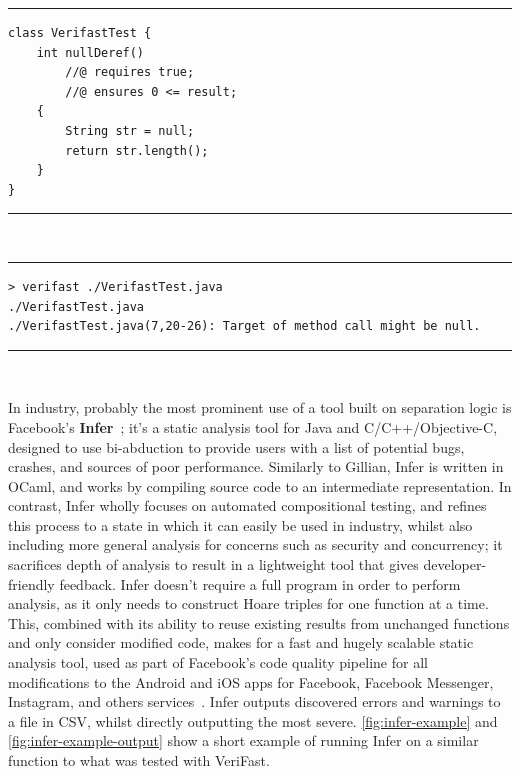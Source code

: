 \noindent\rule{\textwidth}{0.5pt}
\vspace{-0.6cm}
\begin{verbatim}
class VerifastTest {
    int nullDeref()
        //@ requires true;
        //@ ensures 0 <= result;
    {
        String str = null;
        return str.length();
    }
}
\end{verbatim}
\vspace{-0.4cm}
\noindent\rule{\textwidth}{0.5pt}
\vspace{-0.6cm}
~
\label{fig:verifast-example}
\vspace{0.5cm}

\noindent\rule{\textwidth}{0.5pt}
\vspace{-0.6cm}
\begin{verbatim}
> verifast ./VerifastTest.java
./VerifastTest.java
./VerifastTest.java(7,20-26): Target of method call might be null.
\end{verbatim}
\vspace{-0.4cm}
\noindent\rule{\textwidth}{0.5pt}
\vspace{-0.6cm}
~
\label{fig:verifast-example-output}
\vspace{0.5cm}

In industry, probably the most prominent use of a tool built on separation logic
is Facebook's \textbf{Infer}~\cite{infer, infer-site}; it's a static analysis
tool for Java and C/C++/Objective-C, designed to use bi-abduction to provide
users with a list of potential bugs, crashes, and sources of poor performance.
Similarly to Gillian, Infer is written in OCaml, and works by compiling source
code to an intermediate representation. In contrast, Infer wholly focuses on
automated compositional testing, and refines this process to a state in which
it can easily be used in industry, whilst also including more general analysis
for concerns such as security and concurrency; it sacrifices depth of analysis
to result in a lightweight tool that gives developer-friendly feedback.
Infer doesn't require a full program in order to perform analysis, as it only
needs to construct Hoare triples for one function at a time. This, combined with
its ability to reuse existing results from unchanged functions and only consider
modified code, makes for a fast and hugely scalable static analysis tool, used
as part of Facebook's code quality pipeline for all modifications to the Android
and iOS apps for Facebook, Facebook Messenger, Instagram, and others
services~\cite{infer-about}. Infer outputs discovered errors and warnings to a
file in CSV, whilst directly outputting the most severe.
\autoref{fig:infer-example} and \autoref{fig:infer-example-output} show a short
example of running Infer on a similar function to what was tested with VeriFast.

